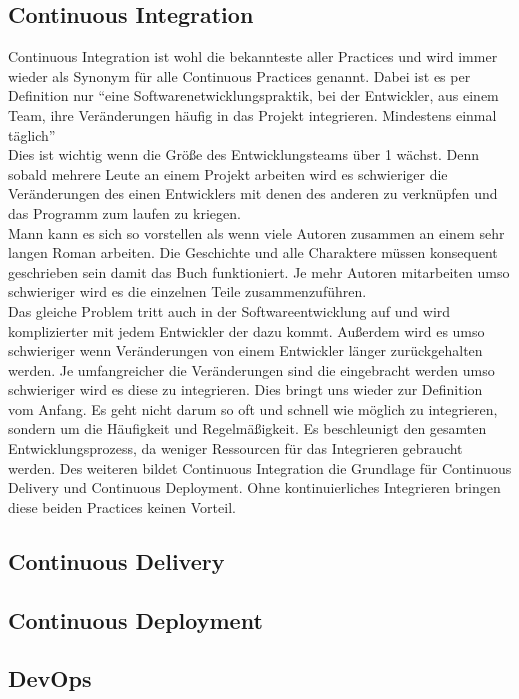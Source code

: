 \subsection{Continuous Integration}
Continuous Integration ist wohl die bekannteste aller Practices und wird immer wieder als Synonym für alle Continuous Practices genannt.\autocite[Vgl.][S.12]{Stahl.2018} Dabei ist es per Definition nur \enquote{eine Softwarenetwicklungspraktik, bei der Entwickler, aus einem Team, ihre Veränderungen häufig in das Projekt integrieren. Mindestens einmal täglich}\autocite[S.12]{Stahl.2018}\\
Dies ist wichtig wenn die Größe des Entwicklungsteams über 1 wächst. Denn sobald mehrere Leute an einem Projekt arbeiten wird es schwieriger die Veränderungen des einen Entwicklers mit denen des anderen zu verknüpfen und das Programm zum laufen zu kriegen.\autocite[Vgl.][S.4]{Stahl.2018}\\ Mann kann es sich so vorstellen als wenn viele Autoren zusammen an einem sehr langen Roman arbeiten. Die Geschichte und alle Charaktere müssen konsequent geschrieben sein damit das Buch funktioniert. Je mehr Autoren mitarbeiten umso schwieriger wird es die einzelnen Teile zusammenzuführen.\\ Das gleiche Problem tritt auch in der Softwareentwicklung auf und wird komplizierter mit jedem Entwickler der dazu kommt. Außerdem wird es umso schwieriger wenn Veränderungen von einem Entwickler länger zurückgehalten werden. Je umfangreicher die Veränderungen sind die eingebracht werden umso schwieriger wird es diese zu integrieren. Dies bringt uns wieder zur Definition vom Anfang. Es geht nicht darum so oft und schnell wie möglich zu integrieren, sondern um die Häufigkeit und Regelmäßigkeit.\autocite[Vgl.][S.3]{Stahl.2018} Es beschleunigt den gesamten Entwicklungsprozess, da weniger Ressourcen für das Integrieren gebraucht werden. Des weiteren bildet Continuous Integration die Grundlage für Continuous Delivery und Continuous Deployment. Ohne kontinuierliches Integrieren bringen diese beiden Practices keinen Vorteil.
\subsection{Continuous Delivery}

\subsection{Continuous Deployment}
\subsection{DevOps}
